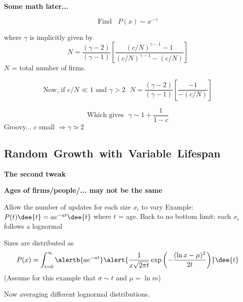   




  \textbf{Some math later...}
    
     
      $$ \mbox{Find} \ \ \ \ P(x) \sim x^{-\gamma} $$
      
       
      where $\gamma$ is implicitly given by
      $$
      N = \frac{(\gamma-2)}{(\gamma-1)}
      \left[
        \frac{(c/N)^{\gamma-1} - 1}
        {(c/N)^{\gamma-1} - (c/N)}
      \right]
      $$
      $N$ = total number of firms.
    
      $$      
      \mbox{Now, if $c/N \ll 1$ and $\gamma>2$}  \ \ \ 
      N = \frac{(\gamma-2)}{(\gamma-1)}
      \left[
        \frac{- 1}
        {- (c/N)}
      \right]
      $$
    
      $$
      \mbox{Which gives} \ \ \ 
      \gamma  \sim 1 + \frac{1}{1-c}
      $$
     \alert{Groovy...}  $c$ small $\Rightarrow \gamma \simeq 2$
    
  
  


\subsection{Random\ Growth\ with\ Variable\ Lifespan}

  \textbf{The second tweak}

  \textbf{Ages of firms/people/... may not be the same}
    
     Allow the number of updates for each size $x_i$
      to vary
     Example: $ P(t) \dee{t} = ae^{-at} \dee{t} $ where $t$ = age.
     Back to no bottom limit: each $x_i$ follows
      a lognormal
    
      Sizes are distributed as\cite{mitzenmacher2003a}
      $$
      P(x) = \int_{t=0}^\infty
      \alertb{a e^{-at}}
      \alert{
      \frac{1}{x \sqrt{2\pi t}}
      \exp
      \left(
        -\frac{(\ln x - \mu)^2}
        {2t}
      \right)
      }
      \dee{t}
      $$
      (Assume for this example that $\sigma \sim t$ and $\mu = \ln m$)
      
      Now averaging different lognormal distributions.
    
